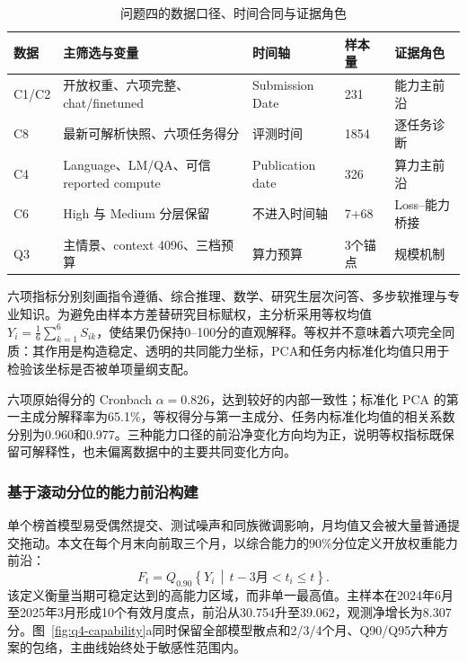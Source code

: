 \begin{table}[htbp]
\caption{问题四的数据口径、时间合同与证据角色}
\label{tab:q4-data-contract}
\CompactTableSetup
\begin{tabularx}{0.92\textwidth}{@{}C{1.15cm}L C{2.00cm}C{1.25cm}C{1.40cm}@{}}
\toprule
数据 & 主筛选与变量 & 时间轴 & 样本量 & 证据角色\\
\midrule
C1/C2 & 开放权重、六项完整、chat/finetuned & Submission Date & 231 & 能力主前沿\\
C8 & 最新可解析快照、六项任务得分 & 评测时间 & 1854 & 逐任务诊断\\
C4 & Language、LM/QA、可信 reported compute & Publication date & 326 & 算力主前沿\\
C6 & High 与 Medium 分层保留 & 不进入时间轴 & 7+68 & Loss--能力桥接\\
Q3 & 主情景、context 4096、三档预算 & 算力预算 & 3个锚点 & 规模机制\\
\bottomrule
\end{tabularx}
\end{table}

六项指标分别刻画指令遵循、综合推理、数学、研究生层次问答、多步软推理与专业知识。为避免由样本方差替研究目标赋权，主分析采用等权均值 $Y_i=\frac{1}{6}\sum_{k=1}^{6}S_{ik}$，使结果仍保持0--100分的直观解释。等权并不意味着六项完全同质：其作用是构造稳定、透明的共同能力坐标，PCA和任务内标准化均值只用于检验该坐标是否被单项量纲支配。

六项原始得分的 Cronbach $\alpha=0.826$，达到较好的内部一致性\cite{cronbach1951}；标准化 PCA 的第一主成分解释率为65.1\%，等权得分与第一主成分、任务内标准化均值的相关系数分别为0.960和0.977。三种能力口径的前沿净变化方向均为正，说明等权指标既保留可解释性，也未偏离数据中的主要共同变化方向。

\subsubsection{基于滚动分位的能力前沿构建}

单个榜首模型易受偶然提交、测试噪声和同族微调影响，月均值又会被大量普通提交拖动。本文在每个月末向前取三个月，以综合能力的90\%分位定义开放权重能力前沿：
\begin{equation}
F_t=Q_{0.90}\!\left\{Y_i\,\middle|\,t-3\text{月}<t_i\le t\right\}.
\label{eq:q4-frontier}
\end{equation}
该定义衡量当期可稳定达到的高能力区域，而非单一最高值。主样本在2024年6月至2025年3月形成10个有效月度点，前沿从30.754升至39.062，观测净增长为8.307分。图~\ref{fig:q4-capability}a同时保留全部模型散点和2/3/4个月、Q90/Q95六种方案的包络，主曲线始终处于敏感性范围内。

